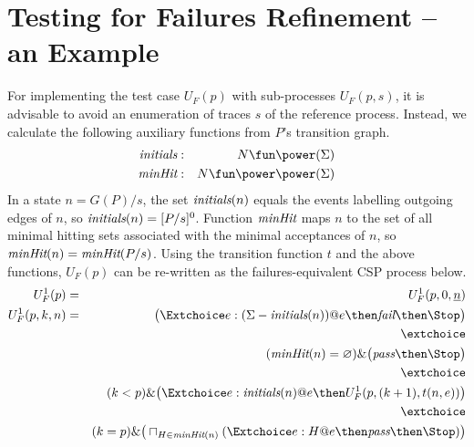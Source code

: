 \section{Testing for Failures Refinement -- an Example}
\label{sec:case}


For implementing the test case $U_F(p)$ with sub-processes $U_F(p,s)$, it is
advisable to avoid an enumeration of traces $s$ of the reference process.
Instead, we calculate the following auxiliary functions from $P$'s transition
graph.
%
\begin{eqnarray*}
\text{\it initials} & : & N \fun \power (\Sigma)
\\
\minhits & : & N \fun \power\power(\Sigma)
\end{eqnarray*}
%
In a state $n = G(P)/s$, the set $\text{\it initials}(n)$ equals the events
labelling outgoing edges of $n$, so  $\text{\it initials}(n) = [P/s]^0$. Function
$\text{\it minHit}$ maps $n$ to the set of all minimal hitting sets associated
with the minimal acceptances of $n$, so $\text{\it minHit}(n) =
\text{\it minHit}(P/s)$. Using the transition function $t$ and the above
functions, $U_F(p)$ can be re-written as the failures-equivalent CSP process
below.
%
\begin{eqnarray}
U_F^1(p) & = & U_F^1(p,0,\ii n)
\\
U_F^1(p,k,n) & = & \big(\Extchoice e:(\Sigma - \text{\it initials}(n)) @ e \then \efail\then \Stop \big)
\label{eq:xufa}
\\ & & \extchoice \nonumber
\\ & & (\minhits(n) = \varnothing)    \&   \big( \epass \then \Stop \big)
\label{eq:xufb}
\\ & & \extchoice \nonumber
\\ & & (k < p) \& \big(\Extchoice e:\text{\it initials}(n) @ e \then U_F^1(p,(k+1),t(n,e)) \big)
\label{eq:xufc}
\\ & & \extchoice \nonumber
\\ & & (k = p) \& \big( \sqcap_{H\in\minhits(n)} (\Extchoice e:H @ e \then \epass \then\Stop ) \big)
\label{eq:xufd}
\end{eqnarray}

